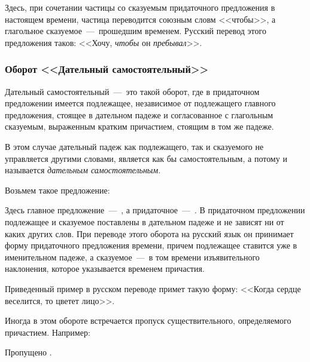 \documentclass[11pt,a4paper,oneside]{memoir}
\begin{document}
    Здесь, при сочетании частицы {} со сказуемым придаточного предложения в настоящем времени, частица {} переводится союзным словм <<чтобы>>, а глагольное сказуемое~---~прошедшим временем. Русский перевод этого предложения таков: <<Хочу, \emph{чтобы} он \emph{пребывал}>>.
    
                \subsubsection{Оборот <<Дательный самостоятельный>>}

    Дательный самостоятельный~---~это такой оборот, где в придаточном предложении имеется подлежащее, независимое от подлежащего главного предложения, стоящее в дательном падеже и согласованное с глагольным сказуемым, выраженным кратким причастием, стоящим в том же падеже.
    
    В этом случае дательный падеж как подлежащего, так и сказуемого не управляется другими словами, является как бы самостоятельным, а потому и называется \emph{дательным самостоятельным}.
    
    Возьмем такое предложение:
    
    \bigskip{}
    
    Здесь главное предложение~---~{}, а придаточное~---~{}. В придаточном предложении подлежащее и сказуемое поставлены в дательном падеже и не зависят ни от каких других слов. При переводе этого оборота на русский язык он принимает форму придаточного предложения времени, причем подлежащее ставится уже в именительном падеже, а сказуемое~---~в том времени изъявительного наклонения, которое указывается временем причастия.
    
    Приведенный пример в русском переводе примет такую форму: <<Когда сердце веселится, то цветет лицо>>.
    
    Иногда в этом обороте встречается пропуск существительного, определяемого причастием. Например:
    
    \bigskip{}
    
    Пропущено {}.
    
    \bigskip{}
    
\end{document}
